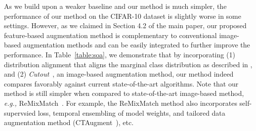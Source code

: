 \documentclass[runningheads]{llncs}
\begin{document}
As we build upon a weaker baseline and our method is much simpler, the performance of our method on the CIFAR-10 dataset is slightly worse in some settings.
However, as we claimed in Section 4.2 of the main paper, our proposed feature-based augmentation method is complementary to conventional image-based augmentation methods and can be easily integrated to further improve the performance.
In Table~\ref{table:soa}, we demonstrate that by incorporating (1) distribution alignment that aligns the marginal class distribution as described in \cite{arazo2019pseudo,berthelot2019remixmatch}, and (2) \emph{Cutout}~\cite{devries2017improved}, an image-based augmentation method, our method indeed compares favorably against current state-of-the-art algorithms.
Note that our method is still simpler when compared to state-of-the-art image-based method, \textit{e.g.,} ReMixMatch~\cite{berthelot2019remixmatch}.
For example, the ReMixMatch method  also incorporates self-supervsied loss, temporal ensembling of model weights, and tailored data augmentation method (CTAugment~\cite{berthelot2019remixmatch}), etc.

\begin{table*}[h]
\begin{center}
\renewcommand{\arraystretch}{1.2}
\caption{
Comparison to other state-of-the-art methods after incorporating some other modern SSL techniques (distribution alignment and Cutout).
We show the results on the CIFAR-10 dataset with varying amounts of labeled samples.
Numbers represent error rate across three runs.
}
\label{table:soa}
\end{center}
\end{table*}
\end{document}
